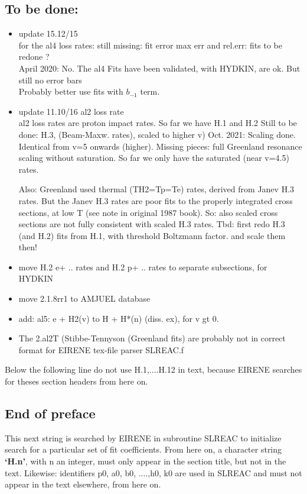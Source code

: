 \documentclass[12pt,dvipdfmx]{article}
\begin{document}
\subsection{To be done:}
\begin{itemize}
\item update 15.12/15 \\
for the al4 loss rates: still missing: fit error max err and rel.err:
fits to be redone  ?\\
April 2020:  No. The al4 Fits have been validated, with HYDKIN, are ok. But still no error bars \\
Probably better use fits with $b_{-1}$ term.
\item update 11.10/16 al2 loss rate \\
al2 loss rates are proton impact rates. So far we have H.1 and H.2
Still to be done:  H.3, (Beam-Maxw. rates), scaled to
higher v)
Oct. 2021: Scaling done. Identical from v=5 onwards (higher).
Missing pieces: full Greenland resonance scaling without saturation.
So far we only have the saturated (near v=4.5) rates.

Also: Greenland used thermal (TH2=Tp=Te) rates, derived from Janev H.3 rates.
But the Janev H.3 rates are poor fits to the properly integrated cross sections, at low T
(see note in original 1987 book). So: also scaled cross sections are not fully
consistent with scaled H.3 rates. Tbd: first redo H.3 (and H.2) fits from H.1, with threshold Boltzmann factor.
and scale them then!

\item  move H.2 e+ .. rates and H.2 p+ .. rates to separate subsections, for HYDKIN\\
\item move 2.1.8rr1 to AMJUEL database\\
\item add:  al5: e + H2(v) to  H + H*(n)  (diss. ex), for v gt 0.
\item The 2.al2T (Stibbe-Tennyson (Greenland fits) are probably not in correct format for EIRENE tex-file parser SLREAC.f
\end{itemize}

Below the following line do not use H.1,....H.12 in text, because EIRENE searches for theses section headers
from here on.


\subsection{End of preface}
This next string is searched by EIRENE in subroutine SLREAC
to initialize search for a particular set of fit coefficients.
From here on, a character string \textbf{`H.n'}, with n an integer, must only appear in the
section title,
but not in the text. Likewise: identifiers p0, a0, b0, ....,h0, k0 are used
in SLREAC and must not
appear in the text elsewhere, from here on.
\end{document}
